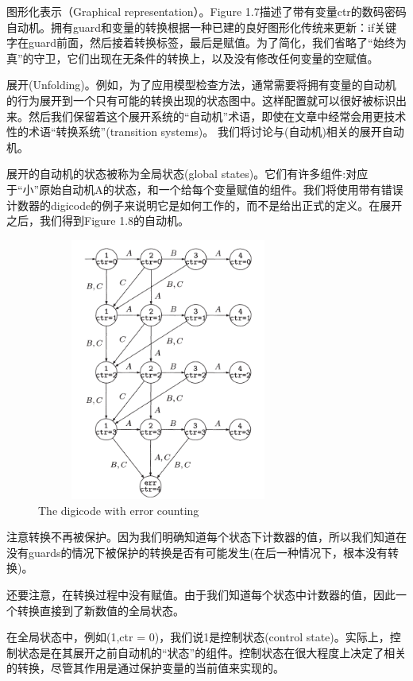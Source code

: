 \documentclass{book}
\begin{document}
    图形化表示（Graphical representation）。Figure 1.7描述了带有变量ctr的数码密码自动机。拥有guard和变量的转换根据一种已建的良好图形化传统来更新：if关键字在guard前面，然后接着转换标签，最后是赋值。为了简化，我们省略了“始终为真”的守卫，它们出现在无条件的转换上，以及没有修改任何变量的空赋值。

    展开(Unfolding)。例如，为了应用模型检查方法，通常需要将拥有变量的自动机的行为展开到一个只有可能的转换出现的状态图中。这样配置就可以很好被标识出来。然后我们保留着这个展开系统的“自动机”术语，即使在文章中经常会用更技术性的术语“转换系统”(transition systems)。 我们将讨论与(自动机)相关的展开自动机。

    展开的自动机的状态被称为全局状态(global states)。它们有许多组件:对应于“小”原始自动机A的状态，和一个给每个变量赋值的组件。我们将使用带有错误计数器的digicode的例子来说明它是如何工作的，而不是给出正式的定义。在展开之后，我们得到Figure 1.8的自动机。
    \begin{figure}
    \centering
    \includegraphics[height=3.4in,width=3.4in]{1_8.png}
    \caption{The digicode with error counting}
    \end{figure}

    注意转换不再被保护。因为我们明确知道每个状态下计数器的值，所以我们知道在没有guards的情况下被保护的转换是否有可能发生(在后一种情况下，根本没有转换)。

    还要注意，在转换过程中没有赋值。由于我们知道每个状态中计数器的值，因此一个转换直接到了新数值的全局状态。

    在全局状态中，例如(1,ctr = 0)，我们说1是控制状态(control state)。实际上，控制状态是在其展开之前自动机的“状态”的组件。控制状态在很大程度上决定了相关的转换，尽管其作用是通过保护变量的当前值来实现的。
\end{document}
